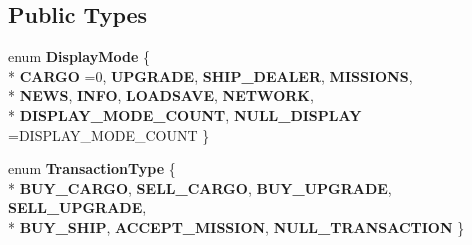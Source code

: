 \subsection*{Public Types}
\begin{DoxyCompactItemize}
\item 
enum {\bfseries Display\+Mode} \{ \\*
{\bfseries C\+A\+R\+GO} =0, 
{\bfseries U\+P\+G\+R\+A\+DE}, 
{\bfseries S\+H\+I\+P\+\_\+\+D\+E\+A\+L\+ER}, 
{\bfseries M\+I\+S\+S\+I\+O\+NS}, 
\\*
{\bfseries N\+E\+WS}, 
{\bfseries I\+N\+FO}, 
{\bfseries L\+O\+A\+D\+S\+A\+VE}, 
{\bfseries N\+E\+T\+W\+O\+RK}, 
\\*
{\bfseries D\+I\+S\+P\+L\+A\+Y\+\_\+\+M\+O\+D\+E\+\_\+\+C\+O\+U\+NT}, 
{\bfseries N\+U\+L\+L\+\_\+\+D\+I\+S\+P\+L\+AY} =D\+I\+S\+P\+L\+A\+Y\+\_\+\+M\+O\+D\+E\+\_\+\+C\+O\+U\+NT
 \}\hypertarget{classBaseComputer_a46b20885af5c38f328ac62bae4eda2b2}{}\label{classBaseComputer_a46b20885af5c38f328ac62bae4eda2b2}

\item 
enum {\bfseries Transaction\+Type} \{ \\*
{\bfseries B\+U\+Y\+\_\+\+C\+A\+R\+GO}, 
{\bfseries S\+E\+L\+L\+\_\+\+C\+A\+R\+GO}, 
{\bfseries B\+U\+Y\+\_\+\+U\+P\+G\+R\+A\+DE}, 
{\bfseries S\+E\+L\+L\+\_\+\+U\+P\+G\+R\+A\+DE}, 
\\*
{\bfseries B\+U\+Y\+\_\+\+S\+H\+IP}, 
{\bfseries A\+C\+C\+E\+P\+T\+\_\+\+M\+I\+S\+S\+I\+ON}, 
{\bfseries N\+U\+L\+L\+\_\+\+T\+R\+A\+N\+S\+A\+C\+T\+I\+ON}
 \}\hypertarget{classBaseComputer_ac8054536252a650d63430dbf97c12440}{}\label{classBaseComputer_ac8054536252a650d63430dbf97c12440}

\end{DoxyCompactItemize}
